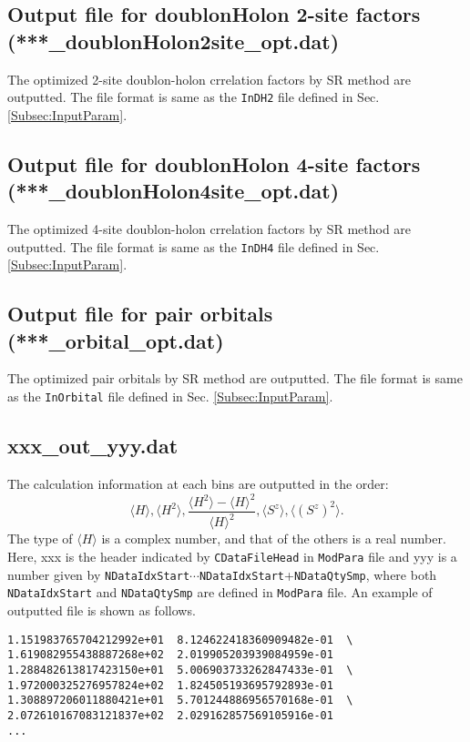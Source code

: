 \subsection{Output file for doublonHolon 2-site factors \\(***\_doublonHolon2site\_opt.dat)}
The optimized 2-site doublon-holon crrelation factors  by SR method are outputted. The file format is same as the \verb|InDH2| file defined in Sec. \ref{Subsec:InputParam}.

\subsection{Output file for doublonHolon 4-site factors \\(***\_doublonHolon4site\_opt.dat)}
The optimized 4-site doublon-holon crrelation factors  by SR method are outputted. The file format is same as the \verb|InDH4| file defined in Sec. \ref{Subsec:InputParam}.

\subsection{Output file for pair orbitals \\(***\_orbital\_opt.dat)}
The optimized pair orbitals by SR method are outputted. The file format is same as the \verb|InOrbital| file defined in Sec. \ref{Subsec:InputParam}.

\subsection{xxx\_out\_yyy.dat}
The calculation information at each bins are outputted in the order:
\begin{equation}
\langle H \rangle, \langle H^2 \rangle, \frac{\langle H^2 \rangle- \langle H \rangle^2 }{\langle H \rangle^2},
\langle S^z \rangle, \langle (S^z)^2 \rangle
\nonumber.
\end{equation}
The type of $\langle H \rangle$ is a complex number, and that of the others is a real number.
Here, xxx is the header indicated by \verb|CDataFileHead| in \verb|ModPara| file and yyy is a number given by \verb|NDataIdxStart|$\cdots$\verb|NDataIdxStart|+\verb|NDataQtySmp|, where both \verb|NDataIdxStart| and \verb|NDataQtySmp| are defined in \verb|ModPara| file.
An example of outputted file is shown as follows.

\begin{minipage}{13cm}
\begin{screen}
\begin{verbatim}
1.151983765704212992e+01  8.124622418360909482e-01  \
1.619082955438887268e+02  2.019905203939084959e-01 
1.288482613817423150e+01  5.006903733262847433e-01  \ 
1.972000325276957824e+02  1.824505193695792893e-01
1.308897206011880421e+01  5.701244886956570168e-01  \
2.072610167083121837e+02  2.029162857569105916e-01
...
\end{verbatim}
\end{screen}
\end{minipage}

